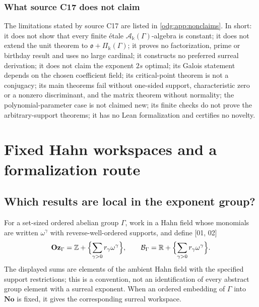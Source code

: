 \documentclass[11pt,oneside]{article}
\numberwithin{equation}{section}
\theoremstyle{definition}
\theoremstyle{remark}
\newcommand{\No}{\mathbf{No}}
\newcommand{\Oz}{\mathbf{Oz}}
\newcommand{\Z}{\mathbb Z}
\newcommand{\R}{\mathbb R}
\newcommand{\src}[1]{\textup{\textsf{\small[#1]}}}
\newcommand{\crA}{\mathcal A_\Bbbk(\Gamma)}
\newcommand{\crP}{\Pi_\Bbbk(\Gamma)}
\begin{document}
\subsubsection{What source C17 does not claim}\label{odg:disc:sub:nonclaims}

The limitations stated by source C17 are listed in \cref{odg:app:nonclaims}. In short: it
does not show that every finite \'etale $\crA$-algebra is constant; it does not extend the
unit theorem to $\mathfrak o+\crP$; it proves no factorization, prime or birthday result and
uses no large cardinal; it constructs no preferred surreal derivation; it does not claim the
exponent $2s$ optimal; its Galois statement depends on the chosen coefficient field; its
critical-point theorem is not a conjugacy; its main theorems fail without one-sided support,
characteristic zero or a nonzero discriminant, and the matrix theorem without normality; the
polynomial-parameter case is not claimed new; its finite checks do not prove the
arbitrary-support theorems; it has no Lean formalization and certifies no novelty.

\section{Fixed Hahn workspaces and a formalization route}\label{odg:sec:formal}

\subsection{Which results are local in the exponent group?}

For a set-sized ordered abelian group $\Gamma$, work in a Hahn field whose
monomials are written $\omega^\gamma$ with reverse-well-ordered supports, and
define \src{01, 02}
\[
 \Oz_\Gamma=\Z+\Bigl\{\sum_{\gamma>0}r_\gamma\omega^\gamma\Bigr\},
 \qquad
 \mathcal B_\Gamma=\R+\Bigl\{\sum_{\gamma>0}r_\gamma\omega^\gamma\Bigr\}.
\]
The displayed sums are elements of the ambient Hahn field with the specified
support restrictions; this is a convention, not an identification of every
abstract group element with a surreal exponent. When an ordered embedding of
$\Gamma$ into $\No$ is fixed, it gives the corresponding surreal workspace.
\end{document}
